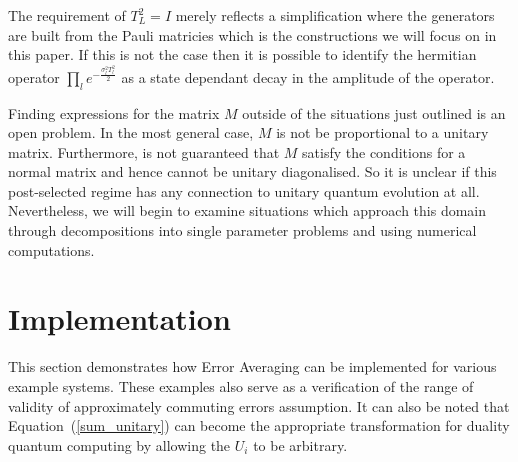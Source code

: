 \documentclass[aps,pra,twocolumn,superscriptaddress,numerical,floatfix]{revtex4-1}
\begin{document}
The requirement of $T_L^2=I$ merely reflects a simplification where the generators are built from the Pauli matricies which is the constructions we will focus on in this paper.  If this is not the case then it is possible to identify the hermitian operator $\prod_l e^{-\frac{\sigma_l^2 T_l^2}{2}}$ as a state dependant decay in the amplitude of the operator.




Finding expressions for the matrix $M$ outside of the situations just outlined is an open problem.  In the most general case, $M$ is not be proportional to a unitary matrix.  Furthermore, is not guaranteed that $M$ satisfy the conditions for a normal matrix and hence cannot be unitary diagonalised.  So it is unclear if this post-selected regime has any connection to unitary quantum evolution at all.  Nevertheless, we will begin to examine situations which approach this domain through decompositions into single parameter problems and using numerical computations.

\section{Implementation\label{implementation}}

This section demonstrates how Error Averaging can be implemented for various example systems. These examples also serve as a verification of the range of validity of approximately commuting errors assumption. It can also be noted that Equation~(\ref{sum_unitary}) can become the appropriate transformation for duality quantum computing by allowing the $U_{i}$ to be arbitrary\cite{dualityQC}.
\end{document}
